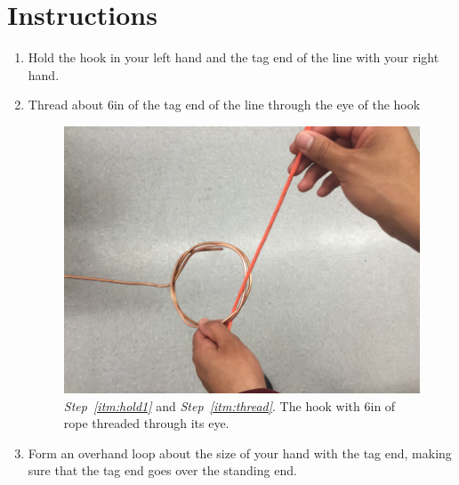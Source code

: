 \documentclass[12pt]{article}
\begin{document}
\section{Instructions}
\begin{enumerate}

\item \label{itm:hold1} Hold the hook in your left hand and the tag end of the line with your right hand.

\item \label{itm:thread} Thread about 6in of the tag end of the line through the eye of the hook

  \begin{figure}[ht!]
    \centering
    \includegraphics[width=1\textwidth]{pic0.png}
    \caption{\textit{Step~\ref{itm:hold1}} and \textit{Step~\ref{itm:thread}}. The hook with 6in of rope threaded through its eye.}
    \label{fig:pic0}
  \end{figure}

\clearpage

\item \label{itm:form} Form an overhand loop about the size of your hand with the tag end, making sure that the tag end goes over the standing end.


\end{enumerate}
\end{document}
